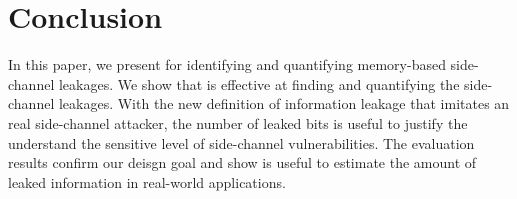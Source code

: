 \section{Conclusion}
In this paper, we present \tool{} for identifying and quantifying 
memory-based side-channel leakages. We show that \tool{} is effective
at finding and quantifying the side-channel leakages. With the new
definition of information leakage that imitates an real side-channel attacker, 
the number of leaked bits is useful to justify the understand 
the sensitive level of side-channel vulnerabilities. 
The evaluation results confirm our deisgn goal and show
\tool{} is useful to estimate the amount of leaked information in 
real-world applications. 